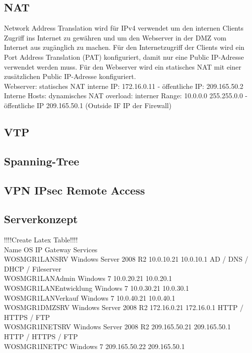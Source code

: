 \documentclass[11pt,a4paper,parskip=half]{scrartcl}
\begin{document}
\subsection{NAT}
Network Address Translation wird für IPv4 verwendet um den internen Clients Zugriff ins Internet zu gewähren und um den Webserver in der DMZ vom Internet aus zugänglich zu machen. Für den Internetzugriff der Clients wird ein Port Address Translation (PAT) konfiguriert, damit nur eine Public IP-Adresse verwendet werden muss. Für den Webserver wird ein statisches NAT mit einer zusätzlichen Public IP-Adresse konfiguriert.\\

Webserver: statisches NAT interne IP: 172.16.0.11 - öffentliche IP: 209.165.50.2\\
Interne Hosts: dynamisches NAT overload: interner Range: 10.0.0.0 255.255.0.0 - öffentliche IP 209.165.50.1 (Outside IF IP der Firewall)

\subsection{VTP}
\subsection{Spanning-Tree}
\subsection{VPN IPsec Remote Access}
\subsection{Serverkonzept}
!!!!Create Latex Table!!!!\\
Name					OS					IP			Gateway		Services\\
WOSMGR1LANSRV			Windows Server 2008 R2		10.0.10.21		10.0.10.1		AD / DNS / DHCP / Fileserver\\
WOSMGR1LANAdmin		Windows 7				10.0.20.21		10.0.20.1\\
WOSMGR1LANEntwicklung		Windows 7				10.0.30.21		10.0.30.1\\
WOSMGR1LANVerkauf		Windows 7				10.0.40.21		10.0.40.1\\
WOSMGR1DMZSRV			Windows Server 2008 R2		172.16.0.21		172.16.0.1		HTTP / HTTPS / FTP\\
WOSMGR1INETSRV			Windows Server 2008 R2		209.165.50.21	209.165.50.1	HTTP / HTTPS / FTP\\
WOSMGR1INETPC			Windows 7				209.165.50.22	209.165.50.1\\
\end{document}
